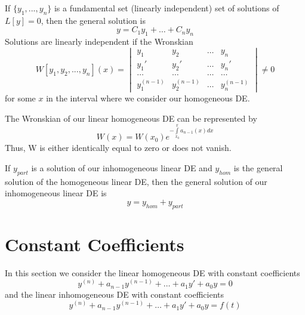 \documentclass[12pt, a4paper, oneside, openright, titlepage]{book}
\begin{document}
\begin{thm}
        If $\{y_1,...,y_n\}$ is a fundamental set (linearly independent) set of solutions of $L[y] = 0$, then the general solution is \begin{equation}
                y = C_1y_1 + \hdots + C_ny_n
        \end{equation}
        Solutions are linearly independent if the Wronskian \begin{equation}
                W[y_1,y_2,...,y_n](x) = \begin{vmatrix} y_1 & y_2 & \hdots & y_n \\ y_1' & y_2' & \hdots & y_n' \\ \hdots & \hdots & \hdots & \hdots \\ y_1^{(n-1)} & y_2^{(n-1)} & \hdots & y_n^{(n-1)} \end{vmatrix} \neq 0
        \end{equation}
        for some $x$ in the interval where we consider our homogeneous DE.
\end{thm}





\begin{thm}
        The Wronskian of our linear homogeneous DE can be represented by \begin{equation}
                W(x) = W(x_0)e^{-\int\limits_{x_0}^xa_{n-1}(x)dx}
        \end{equation}
        Thus, W is either identically equal to zero or does not vanish.
\end{thm}




\begin{thm}
        If $y_{part}$ is a solution of our inhomogeneous linear DE and $y_{hom}$ is the general solution of the homogeneous linear DE, then the general solution of our inhomogeneous linear DE is \begin{equation}
                y = y_{hom} + y_{part}
        \end{equation}
\end{thm}




\section{Constant Coefficients}


\begin{defn}
        In this section we consider the linear homogeneous DE with constant coefficients \begin{equation}
                y^{(n)}+a_{n-1}y^{(n-1)}+\hdots+a_1y'+a_0y = 0
        \end{equation}
        and the linear inhomogeneous DE with constant coefficients \begin{equation}
                y^{(n)}+a_{n-1}y^{(n-1)}+\hdots+a_1y'+a_0y = f(t)
        \end{equation}
\end{defn}
\end{document}
